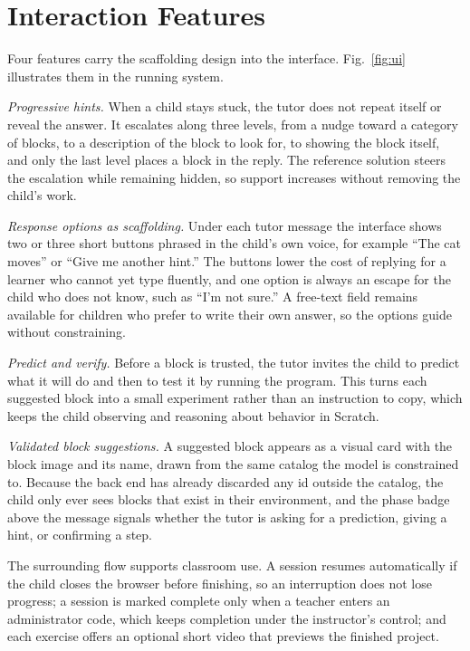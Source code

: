 \documentclass[conference]{IEEEtran}
\begin{document}
\section{Interaction Features}
\label{sec:features}

Four features carry the scaffolding design into the interface. Fig.~\ref{fig:ui} illustrates them in the running system.

\emph{Progressive hints.} When a child stays stuck, the tutor does not repeat itself or reveal the answer. It escalates along three levels, from a nudge toward a category of blocks, to a description of the block to look for, to showing the block itself, and only the last level places a block in the reply. The reference solution steers the escalation while remaining hidden, so support increases without removing the child's work.

\emph{Response options as scaffolding.} Under each tutor message the interface shows two or three short buttons phrased in the child's own voice, for example ``The cat moves'' or ``Give me another hint.'' The buttons lower the cost of replying for a learner who cannot yet type fluently, and one option is always an escape for the child who does not know, such as ``I'm not sure.'' A free-text field remains available for children who prefer to write their own answer, so the options guide without constraining.

\emph{Predict and verify.} Before a block is trusted, the tutor invites the child to predict what it will do and then to test it by running the program. This turns each suggested block into a small experiment rather than an instruction to copy, which keeps the child observing and reasoning about behavior in Scratch.

\emph{Validated block suggestions.} A suggested block appears as a visual card with the block image and its name, drawn from the same catalog the model is constrained to. Because the back end has already discarded any id outside the catalog, the child only ever sees blocks that exist in their environment, and the phase badge above the message signals whether the tutor is asking for a prediction, giving a hint, or confirming a step.

The surrounding flow supports classroom use. A session resumes automatically if the child closes the browser before finishing, so an interruption does not lose progress; a session is marked complete only when a teacher enters an administrator code, which keeps completion under the instructor's control; and each exercise offers an optional short video that previews the finished project.
\end{document}
